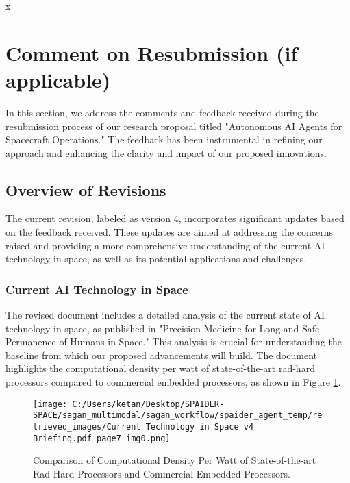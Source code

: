 \documentclass[a4paper,12pt]{article}
\begin{document}





x
\section{Comment on Resubmission (if applicable)}

In this section, we address the comments and feedback received during the resubmission process of our research proposal titled "Autonomous AI Agents for Spacecraft Operations." The feedback has been instrumental in refining our approach and enhancing the clarity and impact of our proposed innovations.

\subsection{Overview of Revisions}

The current revision, labeled as version 4, incorporates significant updates based on the feedback received. These updates are aimed at addressing the concerns raised and providing a more comprehensive understanding of the current AI technology in space, as well as its potential applications and challenges.

\subsubsection{Current AI Technology in Space}

The revised document includes a detailed analysis of the current state of AI technology in space, as published in "Precision Medicine for Long and Safe Permanence of Humans in Space." This analysis is crucial for understanding the baseline from which our proposed advancements will build. The document highlights the computational density per watt of state-of-the-art rad-hard processors compared to commercial embedded processors, as shown in Figure \ref{fig:comp-density}.

\begin{figure}[htbp]
    \centering
    \texttt{[image: C:/Users/ketan/Desktop/SPAIDER-SPACE/sagan\_multimodal/sagan\_workflow/spaider\_agent\_temp/retrieved\_images/Current Technology in Space v4 Briefing.pdf\_page7\_img0.png]}
    \caption{Comparison of Computational Density Per Watt of State-of-the-art Rad-Hard Processors and Commercial Embedded Processors.}
    \label{fig:comp-density}
\end{figure}
\end{document}
